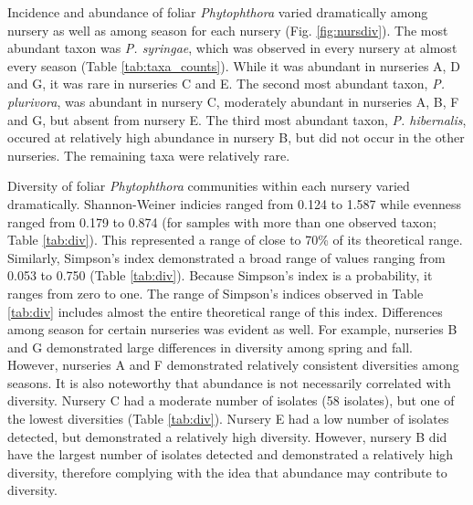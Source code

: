 \documentclass[12pt]{article}
\begin{document}



Incidence and abundance of foliar \emph{Phytophthora} varied dramatically among nursery as well as among season for each nursery (Fig. \ref{fig:nursdiv}).  The most abundant taxon was \emph{P. syringae}, which was observed in every nursery at almost every season (Table \ref{tab:taxa_counts}).  While it was abundant in nurseries A, D and G, it was rare in nurseries C and E.  The second most abundant taxon, \emph{P. plurivora}, was abundant in nursery C, moderately abundant in nurseries A, B, F and G, but absent from nursery E.  The third most abundant taxon, \emph{P. hibernalis}, occured at relatively high abundance in nursery B, but did not occur in the other nurseries.  The remaining taxa were relatively rare.

Diversity of foliar \emph{Phytophthora} communities within each nursery varied dramatically.  Shannon-Weiner indicies ranged from 0.124 to 1.587 while evenness ranged from 0.179 to 0.874 (for samples with more than one observed taxon; Table \ref{tab:div}).  This represented a range of close to 70\% of its theoretical range.  Similarly, Simpson's index demonstrated a broad range of values ranging from 0.053 to 0.750 (Table \ref{tab:div}).  Because Simpson's index is a probability, it ranges from zero to one.  The range of Simpson's indices observed in Table \ref{tab:div} includes almost the entire theoretical range of this index.  Differences among season for certain nurseries was evident as well.  For example, nurseries B and G demonstrated large differences in diversity among spring and fall.  However, nurseries A and F demonstrated relatively consistent diversities among seasons.  It is also noteworthy that abundance is not necessarily correlated with diversity.  Nursery C had a moderate number of isolates (58 isolates), but one of the lowest diversities (Table \ref{tab:div}).  Nursery E had a low number of isolates detected, but demonstrated a relatively high diversity.  However, nursery B did have the largest number of isolates detected and demonstrated a relatively high diversity, therefore complying with the idea that abundance may contribute to diversity.
\end{document}
